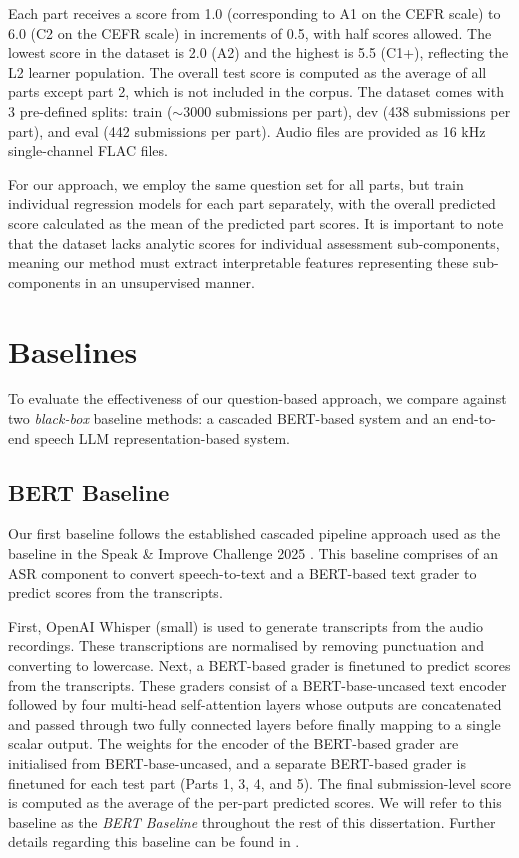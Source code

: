 \documentclass{report}
\begin{document}
Each part receives a score from 1.0 (corresponding to A1 on the CEFR scale) to 6.0 (C2 on the CEFR scale) in increments of 0.5, with half scores allowed. The lowest score in the dataset is 2.0 (A2) and the highest is 5.5 (C1+), reflecting the L2 learner population. The overall test score is computed as the average of all parts except part 2, which is not included in the corpus. The dataset comes with 3 pre-defined splits: train ($\sim$3000 submissions per part), dev (438 submissions per part), and eval (442 submissions per part). Audio files are provided as 16 kHz single-channel FLAC files.

For our approach, we employ the same question set for all parts, but train individual regression models for each part separately, with the overall predicted score calculated as the mean of the predicted part scores. It is important to note that the dataset lacks analytic scores for individual assessment sub-components, meaning our method must extract interpretable features representing these sub-components in an unsupervised manner.

\section{Baselines}
\label{sec:baselines}
To evaluate the effectiveness of our question-based approach, we compare against two \emph{black-box} baseline methods: a cascaded BERT-based system and an end-to-end speech LLM representation-based system.

\subsection{BERT Baseline}
Our first baseline follows the established cascaded pipeline approach used as the baseline in the Speak \& Improve Challenge 2025 \citep{qian2024sandi}. This baseline comprises of an ASR component to convert speech-to-text and a BERT-based text grader to predict scores from the transcripts.

First, OpenAI Whisper (small) \citep{radford2022robustspeechrecognitionlargescale} is used to generate transcripts from the audio recordings. These transcriptions are normalised by removing punctuation and converting to lowercase. Next, a BERT-based grader is finetuned to predict scores from the transcripts. These graders consist of a BERT-base-uncased \citep{devlin2019bertpretrainingdeepbidirectional} text encoder followed by four multi-head self-attention layers whose outputs are concatenated and passed through two fully connected layers before finally mapping to a single scalar output. The weights for the encoder of the BERT-based grader are initialised from BERT-base-uncased, and a separate BERT-based grader is finetuned for each test part (Parts 1, 3, 4, and 5). The final submission-level score is computed as the average of the per-part predicted scores. We will refer to this baseline as the \emph{BERT Baseline} throughout the rest of this dissertation. Further details regarding this baseline can be found in \citet{qian2024sandi}.
\end{document}
